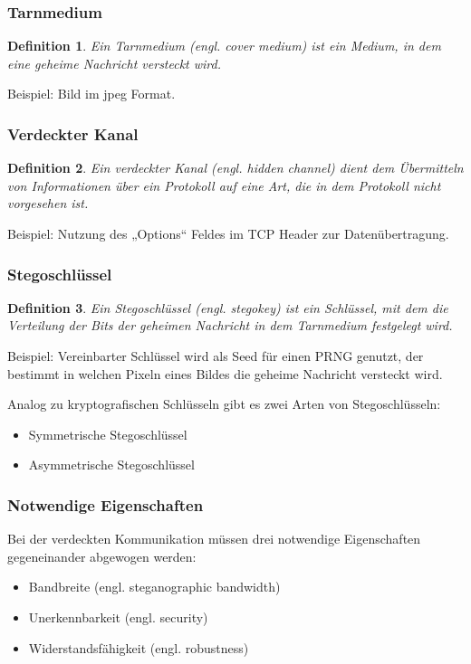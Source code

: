 \documentclass{beamer}
\newtheorem{mydef}{Definition}
\begin{document}
\begin{frame}
  \frametitle{Tarnmedium}
  \begin{mydef}
  Ein Tarnmedium (engl. cover medium) ist ein Medium, in dem eine geheime Nachricht versteckt wird.
  \end{mydef}
  Beispiel: Bild im jpeg Format.
\end{frame}

\begin{frame}
\frametitle{Verdeckter Kanal}
  \begin{mydef}
  Ein verdeckter Kanal (engl. hidden channel) dient dem Übermitteln von Informationen über ein Protokoll auf eine Art, die in dem Protokoll nicht vorgesehen ist.
  \end{mydef}
  Beispiel: Nutzung des „Options“ Feldes im TCP Header zur Datenübertragung.
\end{frame}

\begin{frame}
    \frametitle{Stegoschlüssel}
    \begin{mydef}
    Ein Stegoschlüssel (engl. stegokey) ist ein Schlüssel, mit dem die Verteilung der Bits der geheimen Nachricht in dem Tarnmedium festgelegt wird.
  \end{mydef}
  Beispiel: Vereinbarter Schlüssel wird als Seed für einen PRNG genutzt, der bestimmt in welchen Pixeln eines Bildes die geheime Nachricht versteckt wird.
\end{frame}

\begin{frame}
  Analog zu kryptografischen Schlüsseln gibt es zwei Arten von Stegoschlüsseln:
  \begin{itemize}
	    \item Symmetrische Stegoschlüssel
	    \item Asymmetrische Stegoschlüssel	    
	  \end{itemize}
\end{frame}

\begin{frame}
\frametitle{Notwendige Eigenschaften}
  Bei der verdeckten Kommunikation müssen drei notwendige Eigenschaften gegeneinander abgewogen werden:
  \begin{itemize}
    \item Bandbreite (engl. steganographic bandwidth)
    \item Unerkennbarkeit (engl. security)
    \item Widerstandsfähigkeit (engl. robustness)
  \end{itemize}
  
\end{frame}
\end{document}
